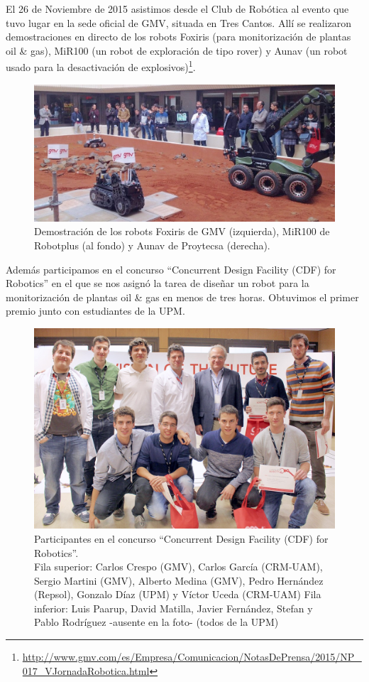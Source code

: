 \documentclass[12pt,twoside]{report}
\begin{document}
El 26 de Noviembre de 2015 asistimos desde el Club de Robótica al evento que tuvo lugar en la sede oficial de GMV, situada en Tres Cantos. Allí se realizaron demostraciones en directo de los robots Foxiris (para monitorización de plantas oil \& gas), MiR100 (un robot de exploración de tipo rover) y Aunav (un robot usado para la desactivación de explosivos)\footnote{\tiny\url{http://www.gmv.com/es/Empresa/Comunicacion/NotasDePrensa/2015/NP_017_VJornadaRobotica.html}}.

\begin{figure}[hbtp]
\centerline{\includegraphics[width=0.8\linewidth]{fotos/2015_V_JornadaRobotica_GMV}}
\caption*{
Demostración de los robots Foxiris de GMV (izquierda), MiR100 de Robotplus (al fondo) y Aunav de Proytecsa (derecha).
}
\end{figure}

Además participamos en el concurso ``Concurrent Design Facility (CDF) for Robotics'' en el que se nos asignó la tarea de diseñar un robot para la monitorización de plantas oil \& gas en menos de tres horas. Obtuvimos el primer premio junto con estudiantes de la UPM.


\begin{figure}[hbtp]
\centerline{\includegraphics[width=0.8\linewidth]{fotos/2015_V_JornadaRobotica_GMV_team}}
\caption*{
Participantes en el concurso ``Concurrent Design Facility (CDF) for Robotics''. \\
Fila superior: Carlos Crespo (GMV), Carlos García (CRM-UAM), Sergio Martini (GMV), Alberto Medina (GMV), Pedro Hernández (Repsol), Gonzalo Díaz (UPM) y Víctor Uceda (CRM-UAM)
Fila inferior: Luis Paarup, David Matilla, Javier Fernández, Stefan y Pablo Rodríguez -ausente en la foto- (todos de la UPM)
}
\end{figure}
\end{document}

